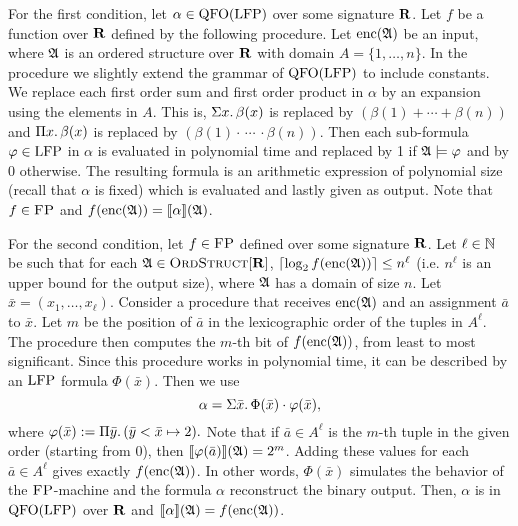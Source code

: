 For the first condition, let $\alpha\in{\rm QFO}({\rm LFP})$ over some signature $\mathbf{R}$. Let $f$ be a function over $\mathbf{R}$ defined by the following procedure. Let ${\rm enc}(\mathfrak{A})$ be an input, where $\mathfrak{A}$ is an ordered structure over $\mathbf{R}$ with domain $A = \{1,\ldots,n\}$. In the procedure we slightly extend the grammar of ${\rm QFO}({\rm LFP})$ to include constants. We replace each first order sum and first order product in $\alpha$ by an expansion using the elements in $A$. This is, $\Sigma{x}.\, \beta(x)$ is replaced by $(\beta(1)+\cdots+\beta(n))$ and $\Pi{x}.\,\beta(x)$ is replaced by $(\beta(1)\cdot\,\cdots\,\cdot\beta(n))$. Then each sub-formula $\varphi\in{\rm LFP}$ in $\alpha$ is evaluated in polynomial time and replaced by 1 if $\mathfrak{A}\models\varphi$ and by 0 otherwise. The resulting formula is an arithmetic expression of polynomial size (recall that $\alpha$ is fixed) which is evaluated and lastly given as output. Note that $f\in\text{\sc FP}$ and $f({\rm enc}(\mathfrak{A})) = {\llbracket{}{\alpha}\rrbracket}(\mathfrak{A})$.
	
For the second condition, let $f\in \text{\sc FP}$ defined over some signature $\mathbf{R}$.
Let $\ell\in\mathbb{N}$ be such that for each $\mathfrak{A}\in\text{\sc OrdStruct}[\mathbf{R}]$, $\lceil\log_2 f({\rm enc}(\mathfrak{A})) \rceil \leq n^\ell$ (i.e. $n^\ell$ is an upper bound for the output size), where $\mathfrak{A}$ has a domain of size $n$.
Let $\bar{x} = (x_1,\ldots,x_{\ell})$.
Consider a procedure that receives ${\rm enc}(\mathfrak{A})$ and an assignment $\bar{a}$ to $\bar{x}$. Let $m$ be the position of $\bar{a}$ in the lexicographic order of the tuples in $A^{\ell}$. The procedure then computes the $m$-th bit of $f({\rm enc}(\mathfrak{A}))$, from least to most significant. Since this procedure works in polynomial time, it can be described by an ${\rm LFP}$ formula $\Phi(\bar{x})$. Then we use
$$
\alpha = \Sigma{\bar{x}}.\, \Phi(\bar{x})\cdot\varphi(\bar{x}),
$$
where $\varphi(\bar{x}) := \Pi{\bar{y}}.\,(\bar{y} < \bar{x} \mapsto 2).$ Note that if $\bar{a} \in A^{\ell}$ is the $m$-th tuple in the given order (starting from 0), then ${\llbracket{}{\varphi(\bar{a})}\rrbracket}(\mathfrak{A}) = 2^{m}$. Adding these values for each $\bar{a}\in A^{\ell}$ gives exactly $f({\rm enc}(\mathfrak{A}))$. 
In other words, $\Phi(\bar{x})$ simulates the behavior of the $\text{\sc FP}$-machine and the formula $\alpha$ reconstruct the binary output.
Then, $\alpha$ is in ${\rm QFO}({\rm LFP})$ over $\mathbf{R}$ and ${\llbracket{}{\alpha}\rrbracket}(\mathfrak{A}) = f({\rm enc}(\mathfrak{A}))$.